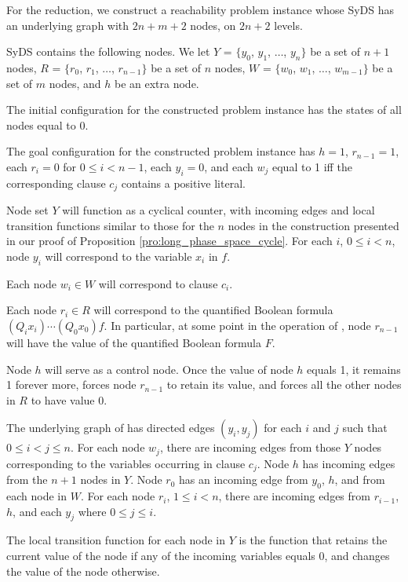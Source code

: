 For the reduction, we construct a reachability problem instance whose SyDS \cals{} 
has an underlying graph with $2n+m+2$ nodes, on $2n+2$ levels. 

SyDS \cals{} contains the following nodes.
We let $Y$ = $\{y_0$, $y_1$, $\ldots$, $y_n\}$ be a set of $n+1$ nodes,
$R$ = $\{r_0$, $r_1$, $\ldots$, $r_{n-1}\}$ be a set of $n$ nodes,
$W$ = $\{w_0$, $w_1$, $\ldots$, $w_{m-1}\}$ be a set of $m$ nodes,
and $h$ be an extra node.
 
The initial configuration \calc{} for the constructed problem instance
 has the states of all nodes equal to 0.

The goal configuration \cald{} for the constructed problem instance 
has $h =1$, $r_{n-1} = 1$,  each  $r_i= 0$ for $0 \leq i  < n-1$, 
each  $y_i= 0$, 
and each $w_j$ equal to 1 iff the corresponding clause 
$c_j$ contains a positive literal.

Node set $Y$ will function as a cyclical counter,
with incoming edges and local transition functions similar to those for
the $n$ nodes in the construction presented in our
proof of Proposition \ref{pro:long_phase_space_cycle}.
For each $i$, $0 \leq i < n$,
node $y_i$ will correspond to the variable $x_i$ in $f$.

Each node $w_i \in W$ will correspond to clause $c_i$.

Each node $r_i \in R$ will correspond to the quantified Boolean formula
$(Q_i x_i) \cdots  (Q_0 x_0) f$.
In particular, at some point in the operation of \cals{},
node $r_{n-1}$ will have the value of the quantified Boolean formula $F$.

Node $h$ will serve as a control node.
Once the value of node $h$ equals 1,  it remains 1 forever more,
forces node $r_{n-1}$ to retain its value, and forces all the other nodes in $R$ to have value 0.

The underlying graph of \cals{} has directed edges
$(y_i, y_j)$ for each $i$ and $j$ such that $0 \leq i < j \leq n$.
For each node $w_j$, there are incoming edges from those $Y$ nodes
corresponding to the variables occurring in clause $c_j$.
Node $h$ has incoming edges from the $n+1$ nodes in $Y$.
Node $r_0$ has an incoming edge from $y_0$, $h$, and from each node in $W$.
For each node $r_i$, $1 \leq i < n$,
there are incoming edges from $r_{i-1}$, $h$, and each $y_j$ where $0 \leq j \leq i$.


The local transition function for each node in $Y$ is the function 
that retains the current value of the node if any of the incoming variables equals 0,
and changes the value of the node otherwise.

